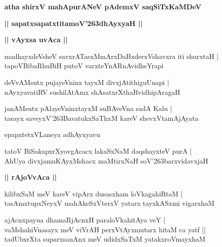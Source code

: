 \documentclass[twoside,12pt,openright]{book}
\def\S{\char'263}
\newcounter{shloka}[chapter]
\def\uvaca#1{\centerline{{\large\textbf{#1}}}}
\begin{document}
\begin{center}
{\LARGE\bfseries atha shirxV mahApurANeV pAdemxV saqSiTxKaMDeV}
\end{center}

\begin{center}
{\LARGE\bfseries || sapatxsapatxtitamoV\S dhAyxyaH || }
\end{center}

\uvaca{|| vAyxsa uvAca ||}

\begin{shloka}%
madhayxdeVsheV savxrATasxMmArxDaBxderxVshavxra iti shurxtaH |\\
tapoVBibaRhuBiH putoV varxteYnARnAvidheYrapi
\end{shloka}

\begin{shloka}%
deVvAMsutx pujayeVninx tayxM divxjAtithiguUnapi |\\
nAyxyavatiRV sushilAtAmx shAsatxrXthaRvidhipAragaH 
\end{shloka}

\begin{shloka}%
janAMsutx pAlayeVninxtayxM suBAveVna sadA Kalu |\\
tasayx saveyxV\S BavatukxSaThxM kareV shevxVtamAjAyata
\end{shloka}

\begin{center}
epapxtetxVLaneya adhAyxyavu
\end{center}

\begin{shloka}%
tatoV BiSakapxrXyovgAcacx lakaSxNaM daqshayxteV purA |\\
AhUya divxjamuKAyxMshacx maMtirxNaH soV\S barxvidavxjaH 
\end{shloka}

\uvaca{|| rAjoVvAca ||}

\begin{shloka}%
kilibxSaM meV kareV vipArx dusasxham loVkagahiRtaM |\\
tasAmxtupxNeyxV mahAkeSxVterxV yatarx tayxkASxmi vigarxhaM 
\end{shloka}

\begin{shloka}%
ajAcnxpayua dhamaRjAcnxH paraloVkahitAya veY |\\
vaMshahiVnasayx meV viVrAH perxVtAyxmutarx hitaM ca yatf ||\\
tadUbxrXta suparxsanAnx meV udidxSaTxM yatakxroVmayxhaM 
\end{shloka}
\end{document}
